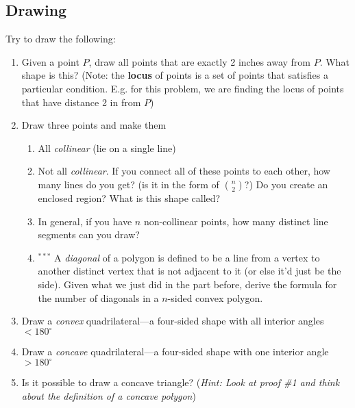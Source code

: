 \subsection{Drawing}
Try to draw the following:

\begin{enumerate}
    \item Given a point $P$, draw all points that are exactly 2 inches away from $P$. What shape is this? (Note: the \textbf{locus} of points is a set of points that satisfies a particular condition. E.g. for this problem, we are finding the locus of points that have distance 2 in from $P$)
    \item Draw three points and make them
        \begin{enumerate}
            \item All \textit{collinear} (lie on a single line)
            \item Not all \textit{collinear}. If you connect all of these points to each other, how many lines do you get? (is it in the form of $\binom{n}{2}$?) Do you create an enclosed region? What is this shape called?
            \item In general, if you have $n$ non-collinear points, how many distinct line segments can you draw?
            \item $^{\ast \ast \ast}$ A \textit{diagonal} of a polygon is defined to be a line from a vertex to another distinct vertex that is not adjacent to it (or else it'd just be the side). Given what we just did in the part before, derive the formula for the number of diagonals in a $n$-sided convex polygon.
        \end{enumerate}
    \item Draw a \textit{convex} quadrilateral---a four-sided shape with all interior angles $<180^{\circ}$
    \item Draw a \textit{concave} quadrilateral---a four-sided shape with one interior angle $>180^{\circ}$
    \item Is it possible to draw a concave triangle? (\textit{Hint: Look at proof \#1 and think about the definition of a concave polygon})
\end{enumerate}

